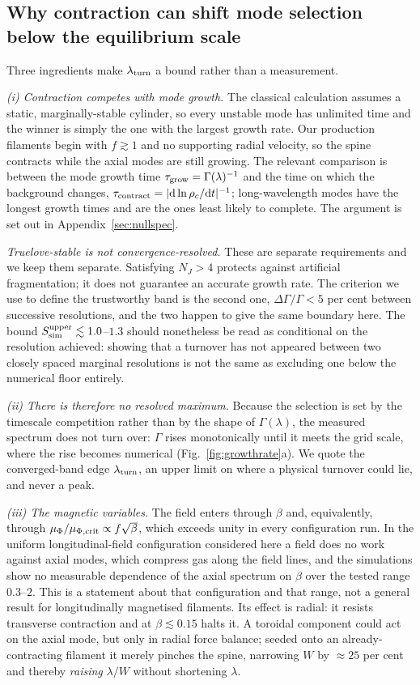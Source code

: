 \documentclass[usenatbib,twoside,twocolumn]{mnras}
\begin{document}
\subsection{Why contraction can shift mode selection below the equilibrium scale}
\label{sec:whyupper}

Three ingredients make $\lambda_{\rm turn}$ a bound rather than a measurement.

\emph{(i) Contraction competes with mode growth.} The classical calculation assumes a static, marginally-stable cylinder, so every unstable mode has unlimited time and the winner is simply the one with the largest growth rate. Our production filaments begin with $f\gtrsim1$ and no supporting radial velocity, so the spine contracts while the axial modes are still growing. The relevant comparison is between the mode growth time $\tau_{\rm grow}=\Gamma(\lambda)^{-1}$ and the time on which the background changes, $\tau_{\rm contract}=|{\rm d}\ln\rho_c/{\rm d}t|^{-1}$; long-wavelength modes have the longest growth times and are the ones least likely to complete. The argument is set out in Appendix~\ref{sec:nullspec}.

\emph{Truelove-stable is not convergence-resolved.} These are separate requirements and we keep them separate. Satisfying $N_J>4$ protects against artificial fragmentation; it does not guarantee an accurate growth rate. The criterion we use to define the trustworthy band is the second one, $\Delta\Gamma/\Gamma<5$ per cent between successive resolutions, and the two happen to give the same boundary here. The bound $S_{\rm sim}^{\rm upper}\lesssim1.0$--$1.3$ should nonetheless be read as conditional on the resolution achieved: showing that a turnover has not appeared between two closely spaced marginal resolutions is not the same as excluding one below the numerical floor entirely.

\emph{(ii) There is therefore no resolved maximum.} Because the selection is set by the timescale competition rather than by the shape of $\Gamma(\lambda)$, the measured spectrum does not turn over: $\Gamma$ rises monotonically until it meets the grid scale, where the rise becomes numerical (Fig.~\ref{fig:growthrate}a). We quote the converged-band edge $\lambda_{\rm turn}$, an upper limit on where a physical turnover could lie, and never a peak.

\emph{(iii) The magnetic variables.} The field enters through $\beta$ and, equivalently, through $\mu_\Phi/\mu_{\Phi,\rm crit}\propto f\sqrt{\beta}$, which exceeds unity in every configuration run. In the uniform longitudinal-field configuration considered here a field does no work against axial modes, which compress gas along the field lines, and the simulations show no measurable dependence of the axial spectrum on $\beta$ over the tested range $0.3$--$2$. This is a statement about that configuration and that range, not a general result for longitudinally magnetised filaments. Its effect is radial: it resists transverse contraction and at $\beta\lesssim0.15$ halts it. A toroidal component could act on the axial mode, but only in radial force balance; seeded onto an already-contracting filament it merely pinches the spine, narrowing $W$ by $\approx25$ per cent and thereby \emph{raising} $\lambda/W$ without shortening $\lambda$.
\end{document}
